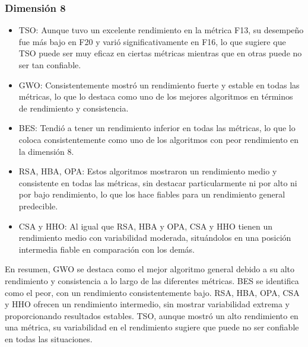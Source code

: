 \documentclass[conference]{IEEEtran}
\begin{document}
\subsubsection{Dimensión 8}
\begin{itemize}
\item TSO: Aunque tuvo un excelente rendimiento en la métrica F13, su desempeño fue más bajo en F20 y varió significativamente en F16, lo que sugiere que TSO puede ser muy eficaz en ciertas métricas mientras que en otras puede no ser tan confiable.
	
\item GWO: Consistentemente mostró un rendimiento fuerte y estable en todas las métricas, lo que lo destaca como uno de los mejores algoritmos en términos de rendimiento y consistencia.
	
\item BES: Tendió a tener un rendimiento inferior en todas las métricas, lo que lo coloca consistentemente como uno de los algoritmos con peor rendimiento en la dimensión 8.
	
\item RSA, HBA, OPA: Estos algoritmos mostraron un rendimiento medio y consistente en todas las métricas, sin destacar particularmente ni por alto ni por bajo rendimiento, lo que los hace fiables para un rendimiento general predecible.
	
\item CSA y HHO: Al igual que RSA, HBA y OPA, CSA y HHO tienen un rendimiento medio con variabilidad moderada, situándolos en una posición intermedia fiable en comparación con los demás.
	
\end{itemize}
\noindent En resumen, GWO se destaca como el mejor algoritmo general debido a su alto rendimiento y consistencia a lo largo de las diferentes métricas. BES se identifica como el peor, con un rendimiento consistentemente bajo. RSA, HBA, OPA, CSA y HHO ofrecen un rendimiento intermedio, sin mostrar variabilidad extrema y proporcionando resultados estables. TSO, aunque mostró un alto rendimiento en una métrica, su variabilidad en el rendimiento sugiere que puede no ser confiable en todas las situaciones.
\end{document}
